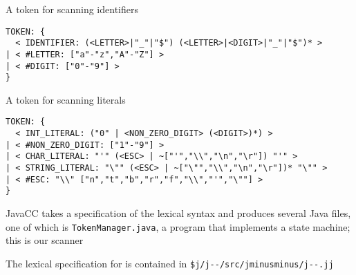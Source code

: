 \documentclass[8pt,a4paper,compress]{beamer}
\begin{document}
\begin{frame}[fragile]
\pause

A token for scanning identifiers

\begin{lstlisting}
TOKEN: {
  < IDENTIFIER: (<LETTER>|"_"|"$") (<LETTER>|<DIGIT>|"_"|"$")* >
| < #LETTER: ["a"-"z","A"-"Z"] >
| < #DIGIT: ["0"-"9"] >
}
\end{lstlisting}

\pause
\bigskip

A token for scanning literals

\begin{lstlisting}
TOKEN: {
  < INT_LITERAL: ("0" | <NON_ZERO_DIGIT> (<DIGIT>)*) >
| < #NON_ZERO_DIGIT: ["1"-"9"] >
| < CHAR_LITERAL: "'" (<ESC> | ~["'","\\","\n","\r"]) "'" >
| < STRING_LITERAL: "\"" (<ESC> | ~["\"","\\","\n","\r"])* "\"" >
| < #ESC: "\\" ["n","t","b","r","f","\\","'","\""] >
}
\end{lstlisting}

\pause
\bigskip

JavaCC takes a specification of the lexical syntax and produces several Java files, one of which is  \lstinline{TokenManager.java}, a program that implements a state machine; this is our scanner

\pause
\bigskip

The lexical specification for \jmm is contained in \lstinline{$j/j--/src/jminusminus/j--.jj}
\end{frame}
\end{document}
